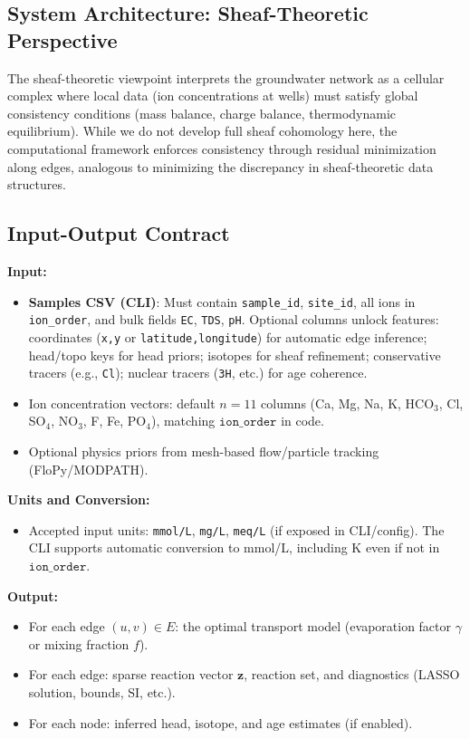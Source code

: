 \documentclass[12pt,a4paper]{article}
\theoremstyle{plain}
\theoremstyle{definition}
\theoremstyle{remark}
\begin{document}
\subsection{System Architecture: Sheaf-Theoretic Perspective}\label{sec:sheaf}
The sheaf-theoretic viewpoint interprets the groundwater network as a cellular complex where local data (ion concentrations at wells) must satisfy global consistency conditions (mass balance, charge balance, thermodynamic equilibrium). While we do not develop full sheaf cohomology here, the computational framework enforces consistency through residual minimization along edges, analogous to minimizing the discrepancy in sheaf-theoretic data structures.

\subsection{Input-Output Contract}\label{sec:io_contract}

\textbf{Input:}
\begin{itemize}
	\item \textbf{Samples CSV (CLI)}: Must contain \texttt{sample\_id}, \texttt{site\_id}, all ions in \texttt{ion\_order}, and bulk fields \texttt{EC}, \texttt{TDS}, \texttt{pH}. 
	Optional columns unlock features: coordinates (\texttt{x,y} or \texttt{latitude,longitude}) for automatic edge inference; head/topo keys for head priors; isotopes for sheaf refinement; conservative tracers (e.g., \texttt{Cl}); nuclear tracers (\texttt{3H}, etc.) for age coherence.
	\item Ion concentration vectors: default $n=11$ columns (Ca, Mg, Na, K, HCO$_3$, Cl, SO$_4$, NO$_3$, F, Fe, PO$_4$), matching $\texttt{ion\_order}$ in code. 
	\item Optional physics priors from mesh-based flow/particle tracking (FloPy/MODPATH).
\end{itemize}

\textbf{Units and Conversion:}
\begin{itemize}
	\item Accepted input units: \texttt{mmol/L}, \texttt{mg/L}, \texttt{meq/L} (if exposed in CLI/config). The CLI supports automatic conversion to mmol/L, including K even if not in $\texttt{ion\_order}$.
\end{itemize}

\textbf{Output:}
\begin{itemize}
	\item For each edge $(u,v) \in E$: the optimal transport model (evaporation factor $\gamma$ or mixing fraction $f$).
	\item For each edge: sparse reaction vector $\mathbf{z}$, reaction set, and diagnostics (LASSO solution, bounds, SI, etc.).
	\item For each node: inferred head, isotope, and age estimates (if enabled).
\end{itemize}
\end{document}
